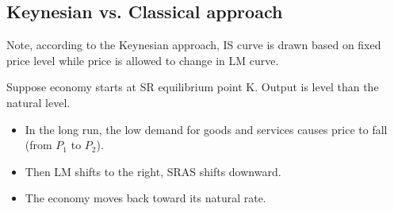 \documentclass[10pt]{article}
\begin{document}
\begin{figure}[H]
\end{figure}




\subsection{Keynesian vs. Classical approach}

\begin{figure}[H]
\end{figure}


Note, according to the Keynesian approach, IS curve is drawn based on fixed price level
while price is allowed to change in LM curve.


Suppose economy starts at SR equilibrium point K. Output is level than the natural
level.
\begin{itemize}
\item In the long run, the low demand for goods and services causes price to fall
		(from $ P_1 $ to $ P_2 $).
\item Then LM shifts to the right, SRAS shifts downward.
\item The economy moves back toward its natural rate.
\end{itemize}
\end{document}
